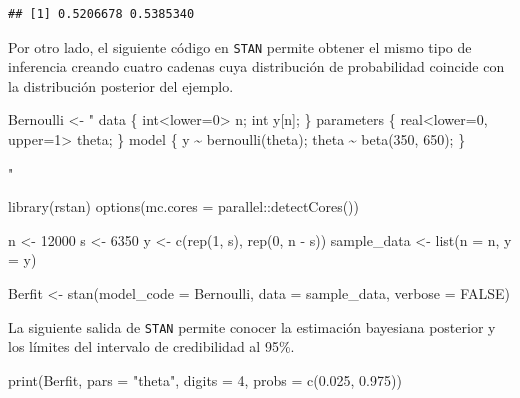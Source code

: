 \documentclass[
  10pt,
  spanish,
]{book}
\newenvironment{Shaded}{\begin{snugshade}}{\end{snugshade}}
\newcommand{\AttributeTok}[1]{\textcolor[rgb]{0.77,0.63,0.00}{#1}}
\newcommand{\ConstantTok}[1]{\textcolor[rgb]{0.00,0.00,0.00}{#1}}
\newcommand{\DecValTok}[1]{\textcolor[rgb]{0.00,0.00,0.81}{#1}}
\newcommand{\FloatTok}[1]{\textcolor[rgb]{0.00,0.00,0.81}{#1}}
\newcommand{\FunctionTok}[1]{\textcolor[rgb]{0.00,0.00,0.00}{#1}}
\newcommand{\NormalTok}[1]{#1}
\newcommand{\OtherTok}[1]{\textcolor[rgb]{0.56,0.35,0.01}{#1}}
\newcommand{\SpecialCharTok}[1]{\textcolor[rgb]{0.00,0.00,0.00}{#1}}
\newcommand{\StringTok}[1]{\textcolor[rgb]{0.31,0.60,0.02}{#1}}
\theoremstyle{definition}
\theoremstyle{definition}
\theoremstyle{definition}
\theoremstyle{definition}
\theoremstyle{remark}
\begin{document}
\begin{verbatim}
## [1] 0.5206678 0.5385340
\end{verbatim}

Por otro lado, el siguiente código en \texttt{STAN} permite obtener el mismo
tipo de inferencia creando cuatro cadenas cuya distribución de
probabilidad coincide con la distribución posterior del ejemplo.

\begin{Shaded}
\begin{Highlighting}[]
\NormalTok{Bernoulli }\OtherTok{\textless{}{-}} \StringTok{"}
\StringTok{data \{}
\StringTok{  int\textless{}lower=0\textgreater{} n;}
\StringTok{  int y[n];}
\StringTok{\}}
\StringTok{parameters \{}
\StringTok{  real\textless{}lower=0, upper=1\textgreater{} theta;}
\StringTok{\}}
\StringTok{model \{}
\StringTok{  y \textasciitilde{} bernoulli(theta);}
\StringTok{  theta \textasciitilde{} beta(350, 650);}
\StringTok{\}}

\StringTok{"}

\FunctionTok{library}\NormalTok{(rstan)}
\FunctionTok{options}\NormalTok{(}\AttributeTok{mc.cores =}\NormalTok{ parallel}\SpecialCharTok{::}\FunctionTok{detectCores}\NormalTok{())}

\NormalTok{n }\OtherTok{\textless{}{-}} \DecValTok{12000}
\NormalTok{s }\OtherTok{\textless{}{-}} \DecValTok{6350}
\NormalTok{y }\OtherTok{\textless{}{-}} \FunctionTok{c}\NormalTok{(}\FunctionTok{rep}\NormalTok{(}\DecValTok{1}\NormalTok{, s), }\FunctionTok{rep}\NormalTok{(}\DecValTok{0}\NormalTok{, n }\SpecialCharTok{{-}}\NormalTok{ s))}
\NormalTok{sample\_data }\OtherTok{\textless{}{-}} \FunctionTok{list}\NormalTok{(}\AttributeTok{n =}\NormalTok{ n, }\AttributeTok{y =}\NormalTok{ y)}

\NormalTok{Berfit }\OtherTok{\textless{}{-}} \FunctionTok{stan}\NormalTok{(}\AttributeTok{model\_code =}\NormalTok{ Bernoulli, }
               \AttributeTok{data =}\NormalTok{ sample\_data, }\AttributeTok{verbose =} \ConstantTok{FALSE}\NormalTok{)}
\end{Highlighting}
\end{Shaded}

La siguiente salida de \texttt{STAN} permite conocer la estimación bayesiana posterior y los límites del intervalo de credibilidad al 95\%.

\begin{Shaded}
\begin{Highlighting}[]
\FunctionTok{print}\NormalTok{(Berfit, }\AttributeTok{pars =} \StringTok{"theta"}\NormalTok{, }
      \AttributeTok{digits =} \DecValTok{4}\NormalTok{, }\AttributeTok{probs =} \FunctionTok{c}\NormalTok{(}\FloatTok{0.025}\NormalTok{, }\FloatTok{0.975}\NormalTok{))}
\end{Highlighting}
\end{Shaded}
\end{document}
